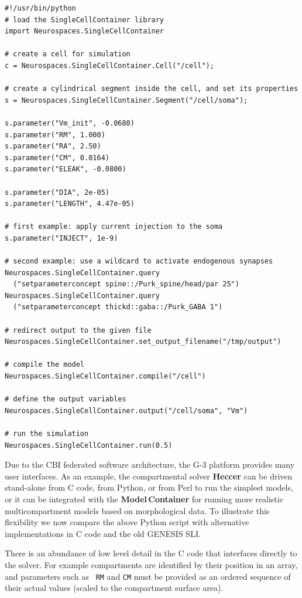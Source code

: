 \documentclass[12pt]{article}
\begin{document}
{\vspace*{1mm}
 { \footnotesize
  \linenumbers
  {\begin{verbatim}
#!/usr/bin/python
# load the SingleCellContainer library
import Neurospaces.SingleCellContainer

# create a cell for simulation
c = Neurospaces.SingleCellContainer.Cell("/cell");

# create a cylindrical segment inside the cell, and set its properties
s = Neurospaces.SingleCellContainer.Segment("/cell/soma");

s.parameter("Vm_init", -0.0680)
s.parameter("RM", 1.000)
s.parameter("RA", 2.50)
s.parameter("CM", 0.0164)
s.parameter("ELEAK", -0.0800)

s.parameter("DIA", 2e-05)
s.parameter("LENGTH", 4.47e-05)

# first example: apply current injection to the soma
s.parameter("INJECT", 1e-9)

# second example: use a wildcard to activate endogenous synapses
Neurospaces.SingleCellContainer.query
  ("setparameterconcept spine::/Purk_spine/head/par 25")
Neurospaces.SingleCellContainer.query
  ("setparameterconcept thickd::gaba::/Purk_GABA 1")

# redirect output to the given file
Neurospaces.SingleCellContainer.set_output_filename("/tmp/output")

# compile the model
Neurospaces.SingleCellContainer.compile("/cell")

# define the output variables
Neurospaces.SingleCellContainer.output("/cell/soma", "Vm")
    
# run the simulation
Neurospaces.SingleCellContainer.run(0.5)
\end{verbatim}
  \vspace*{1mm} }}}

Due to the CBI federated software architecture, the G-3 platform provides many user
interfaces.  As an example, the compartmental solver {\bf Heccer} can be driven
stand-alone from C code, from Python, or from Perl to run the simplest
models, or it can be integrated with the {\bf Model\,Container} for
running more realistic multicompartment models based on morphological
data.  To illustrate this flexibility we now compare the above Python
script with alternative implementations in C code and the old GENESIS SLI.

There is an abundance of low level detail in the C code that
interfaces directly to the solver.  For example compartments are
identified by their position in an array, and parameters such as {\tt
  RM} and {\tt CM} must be provided as an ordered sequence of their
actual values (scaled to the compartment surface area).
\end{document}
